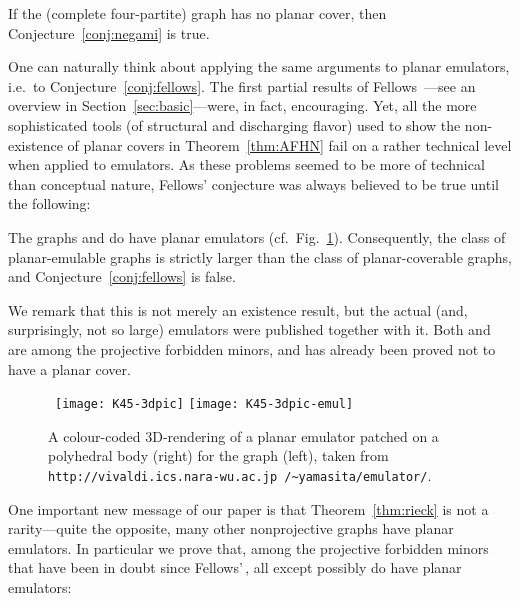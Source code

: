 \documentclass[envcountsect,envcountsame]{llncs}
\begin{document}
\begin{theorem}
\label{thm:AFHN}
If the (complete four-partite) graph  has no planar cover,
then Conjecture~\ref{conj:negami} is true.
\end{theorem}

One can naturally think about applying the same arguments to planar emulators,
i.e.\ to Conjecture~\ref{conj:fellows}.
The first partial results of Fellows~\cite{cit:femul}---see an overview in Section~\ref{sec:basic}---were, in fact, encouraging.
Yet, all the more sophisticated tools (of structural and discharging
flavor) used to show the non-existence of planar covers in Theorem~\ref{thm:AFHN}
fail on a rather technical level when applied to emulators. 
As these problems seemed to be more of technical than conceptual nature, 
Fellows' conjecture was always believed to be true until the following:


\begin{theorem}
\label{thm:rieck}\hfill
The graphs  and \mbox{}
do have planar emulators (cf.\ Fig.~\ref{fig:K45.3D}).
Consequently, the class of planar-emulable graphs is strictly larger than
the class of planar-coverable graphs, and Conjecture~\ref{conj:fellows} is
false.
\end{theorem}
We remark that this is not merely an existence result, but the actual
(and, surprisingly, not so large) emulators were published together with it.
Both  and \mbox{} are among the
projective forbidden minors, and \mbox{} has already 
been proved not to have a planar cover.



\begin{figure}[tb]
\centering
~\hbox{\texttt{[image: K45-3dpic]}}
	\qquad{}\hbox{\Large}\qquad
	\texttt{[image: K45-3dpic-emul]}
\caption{A colour-coded 3D-rendering of a planar emulator patched on a polyhedral body (right) for the
	 graph \mbox{} (left), taken from
	{\scriptsize\tt http://vivaldi.ics.nara-wu.ac.jp /\~{}yamasita/emulator/}.}
\label{fig:K45.3D}
\end{figure}

One important new message of our paper is that Theorem~\ref{thm:rieck} is
not a rarity---quite the opposite, many other nonprojective graphs have
planar emulators.
In particular we prove that, 
among the projective forbidden minors that have been in
doubt since Fellows'\,\cite{cit:femul}, all except possibly
 do have planar emulators:
\end{document}
